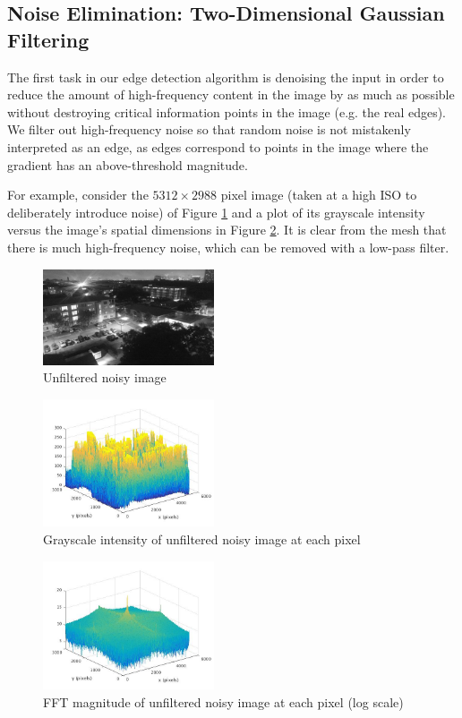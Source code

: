 \documentclass[journal]{IEEEtran}
\begin{document}
\subsection{Noise Elimination: Two-Dimensional Gaussian Filtering}
The first task in our edge detection algorithm is denoising the input in order to reduce the amount of high-frequency content in the image by as much as possible without destroying critical information points in the image (e.g. the real edges). We filter out high-frequency noise so that random noise is not mistakenly interpreted as an edge, as edges correspond to points in the image where the gradient has an above-threshold magnitude. \par
For example, consider the $5312 \times 2988$ pixel image (taken at a high ISO to deliberately introduce noise) of Figure \ref{noisy-image} and a plot of its grayscale intensity versus the image's spatial dimensions in Figure \ref{noisy-image-mesh}. It is clear from the mesh that there is much high-frequency noise, which can be removed with a low-pass filter.
\begin{figure}[H]
	\centering
	\includegraphics[width=0.45\textwidth]{noisy_image.jpg}
	\caption{Unfiltered noisy image}
    \label{noisy-image}
\end{figure}
\begin{figure}[h]
	\centering
	\includegraphics[width=0.45\textwidth]{noisy_image_mesh.jpg}
	\caption{Grayscale intensity of unfiltered noisy image at each pixel}
    \label{noisy-image-mesh}
\end{figure}
\begin{figure}[h]
	\centering
	\includegraphics[width=0.45\textwidth]{fft_noisy_image.jpg}
	\caption{FFT magnitude of unfiltered noisy image at each pixel (log scale)}
    \label{noisy-image-fft}
\end{figure}
\end{document}
